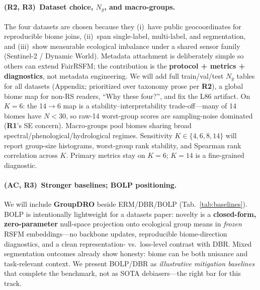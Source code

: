 \documentclass[10pt,twocolumn,letterpaper]{article}
\newcommand{\Rone}{\textcolor{RoneBlue}{\textbf{R1}}}
\newcommand{\Rtwo}{\textcolor{RtwoRed}{\textbf{R2}}}
\newcommand{\Rthree}{\textcolor{RthreeGreen}{\textbf{R3}}}
\newcommand{\AC}{\textcolor{ACPurple}{\textbf{AC}}}
\begin{document}
{\paragraph{(\Rtwo, \Rthree)\, Dataset choice, $N_g$, and macro-groups.}
The four datasets are chosen because they (i)~have public geocoordinates for reproducible biome joins, (ii)~span single-label, multi-label, and segmentation, and (iii)~show measurable ecological imbalance under a shared sensor family (Sentinel-2 / Dynamic World). Metadata attachment is deliberately simple so others can extend FairRSFM; the contribution is the \textbf{protocol + metrics + diagnostics}, not metadata engineering. We will add full train/val/test $N_g$ tables for all datasets (Appendix; prioritized over taxonomy prose per \Rtwo), a global biome map for non-RS readers, ``Why these four?'', and fix the L86 artifact. On $K{=}6$: the 14$\to$6 map is a stability--interpretability trade-off---many of 14 biomes have $N{<}30$, so raw-14 worst-group scores are sampling-noise dominated (\Rone's SE concern). Macro-groups pool biomes sharing broad spectral/phenological/hydrological regimes. Sensitivity $K{\in}\{4,6,8,14\}$ will report group-size histograms, worst-group rank stability, and Spearman rank correlation across $K$. Primary metrics stay on $K{=}6$; $K{=}14$ is a fine-grained diagnostic.

\vspace{-0.28em}
\paragraph{(\AC, \Rthree)\, Stronger baselines; BOLP positioning.}
We will include \textbf{GroupDRO} beside ERM/DBR/BOLP (Tab.~\ref{tab:baselines}). BOLP is intentionally lightweight for a datasets paper: novelty is a \textbf{closed-form, zero-parameter} null-space projection onto ecological group means in \emph{frozen} RSFM embeddings---no backbone updates, reproducible biome-direction diagnostics, and a clean representation- vs.\ loss-level contrast with DBR. Mixed segmentation outcomes already show honesty: biome can be both nuisance and task-relevant context. We present BOLP/DBR as \emph{illustrative mitigation baselines} that complete the benchmark, not as SOTA debiasers---the right bar for this track.

}
\end{document}
